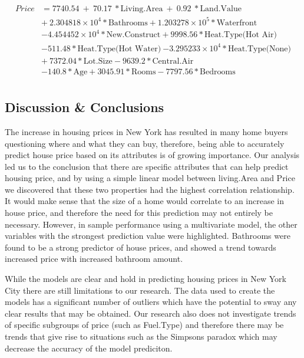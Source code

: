 \documentclass[letterpaper,9pt,twocolumn,twoside,]{pinp}
\begin{document}
\begin{equation}
  \begin{aligned}
Price&=7740.54\ +\ 70.17\ * \text{Living.Area}\ +\ 0.92\ * \text{Land.Value} \\
&+\ \ensuremath{2.304818\times 10^{4}} * \text{Bathrooms} + \ensuremath{1.203278\times 10^{5}} * \text{Waterfront}\   \\
& \ensuremath{-4.454452\times 10^{4}} * \text{New.Construct} + 9998.56 * \text{Heat.Type(Hot Air)}\ \\
& -511.48 * \text{Heat.Type(Hot Water)}\ \ensuremath{-3.295233\times 10^{4}} * \text{Heat.Type(None)}\\
&+\ 7372.04 * \text{Lot.Size} - 9639.2 * \text{Central.Air}\\
& -140.8 * \text{Age} + 3045.91 * \text{Rooms}  -7797.56 * \text{Bedrooms}\\
       \label{eqn:example}
  \end{aligned}
\end{equation}

\hypertarget{discussion-conclusions}{%
\subsection{Discussion \& Conclusions}\label{discussion-conclusions}}

The increase in housing prices in New York has resulted in many home
buyers questioning where and what they can buy, therefore, being able to
accurately predict house price based on its attributes is of growing
importance. Our analysis led us to the conclusion that there are
specific attributes that can help predict housing price, and by using a
simple linear model between living.Area and Price we discovered that
these two properties had the highest correlation relationship. It would
make sense that the size of a home would correlate to an increase in
house price, and therefore the need for this prediction may not entirely
be necessary. However, in sample performance using a multivariate model,
the other variables with the strongest prediction value were
highlighted. Bathrooms were found to be a strong predictor of house
prices, and showed a trend towards increased price with increased
bathroom amount.

While the models are clear and hold in predicting housing prices in New
York City there are still limitations to our research. The data used to
create the models has a significant number of outliers which have the
potential to sway any clear results that may be obtained. Our research
also does not investigate trends of specific subgroups of price (such as
Fuel.Type) and therefore there may be trends that give rise to
situations such as the Simpsons paradox which may decrease the accuracy
of the model prediciton.
\end{document}
